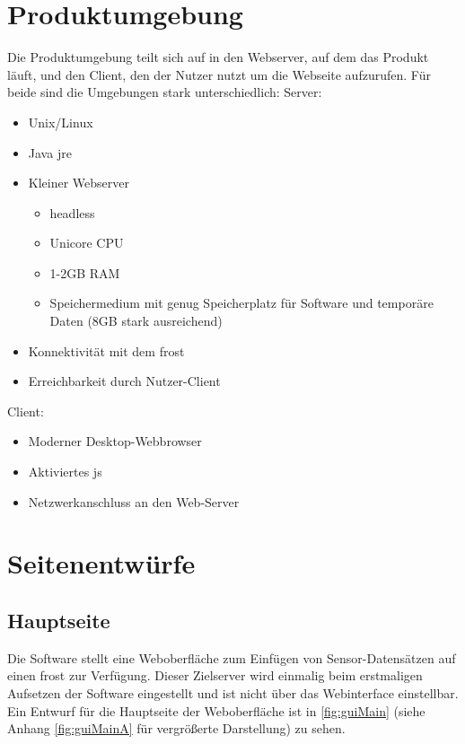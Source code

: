 \documentclass[a4paper, 12 pt]{article}
\begin{document}
\section{Produktumgebung}
Die Produktumgebung teilt sich auf in den Webserver, auf dem das Produkt läuft, und den Client, den der Nutzer nutzt um die Webseite aufzurufen. Für beide sind die Umgebungen stark unterschiedlich:
Server:
\begin{itemize}
	\item Unix/Linux
	\item Java \gls{jre}
	\item Kleiner Webserver
	\begin{itemize}
		\item \gls{headless}
		\item Unicore CPU
		\item 1-2GB RAM
		\item Speichermedium mit genug Speicherplatz für Software und temporäre Daten (8GB stark ausreichend)
	\end{itemize}
	\item Konnektivität mit dem \gls{frost}
	\item Erreichbarkeit durch Nutzer-Client
\end{itemize}

\noindent Client:

\begin{itemize}
	\item Moderner Desktop-Webbrowser
	\item Aktiviertes \gls{js}
	\item Netzwerkanschluss an den Web-Server
\end{itemize}


\section{Seitenentwürfe}

\subsection{Hauptseite}
Die Software stellt eine Weboberfläche zum Einfügen von Sensor-Datensätzen auf einen \gls{frost} zur Verfügung. 
Dieser Zielserver wird einmalig beim erstmaligen Aufsetzen der Software eingestellt und ist nicht über das Webinterface einstellbar. 
Ein Entwurf für die Hauptseite der Weboberfläche ist in \cref{fig:guiMain} (siehe Anhang \cref{fig:guiMainA} für vergrößerte Darstellung) zu sehen.
\\
\end{document}
